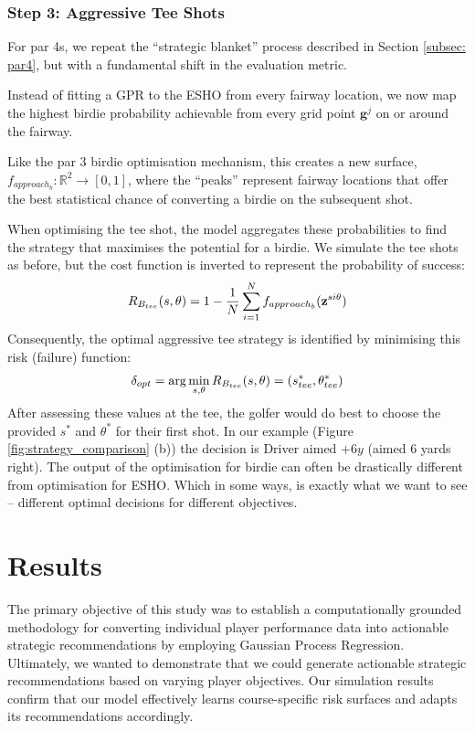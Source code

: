 \documentclass[11pt, letterpaper]{article}
\begin{document}
\subsubsection{Step 3: Aggressive Tee Shots}

For par 4s, we repeat the ``strategic blanket'' process described in Section \ref{subsec: par4}, but with a fundamental shift in the evaluation metric.

Instead of fitting a GPR to the ESHO from every fairway location, we now map the highest birdie probability achievable from every grid point $\mathbf{g}^j$ on or around the fairway.

Like the par 3 birdie optimisation mechanism, this creates a new surface, $f_{approach_b}: \mathbb{R}^2 \to [0,1]$, where the ``peaks'' represent fairway locations that offer the best statistical chance of converting a birdie on the subsequent shot.

When optimising the tee shot, the model aggregates these probabilities to find the strategy that maximises the potential for a birdie. We simulate the tee shots as before, but the cost function is inverted to represent the probability of success:
$$R_{B_{tee}}(s, \theta) = 1 - \frac{1}{N} \sum^N_{i =1} f_{approach_b}(\mathbf{z}^{si\theta})$$
Consequently, the optimal aggressive tee strategy is identified by minimising this risk (failure) function: 
\[\delta_{opt} =\arg\min_{s,\theta} R_{B_{tee}}(s, \theta) = (s^*_{tee}, \theta^*_{tee})\]
After assessing these values at the tee, the golfer would do best to choose the provided $s^*$ and $\theta^*$ for their first shot. In our example (Figure \ref{fig:strategy_comparison} (b)) the decision is Driver aimed $+6y$ (aimed $6$ yards right).
The output of the optimisation for birdie can often be drastically different from optimisation for ESHO. Which in some ways, is exactly what we want to see – different optimal decisions for different objectives. 

\section{Results}
\label{sec:Results}
The primary objective of this study was to establish a computationally grounded methodology for converting individual player performance data into actionable strategic recommendations by employing Gaussian Process Regression. Ultimately, we wanted to demonstrate that we could generate actionable strategic recommendations based on varying player objectives. Our simulation results confirm that our model effectively learns course-specific risk surfaces and adapts its recommendations accordingly. 
\end{document}
